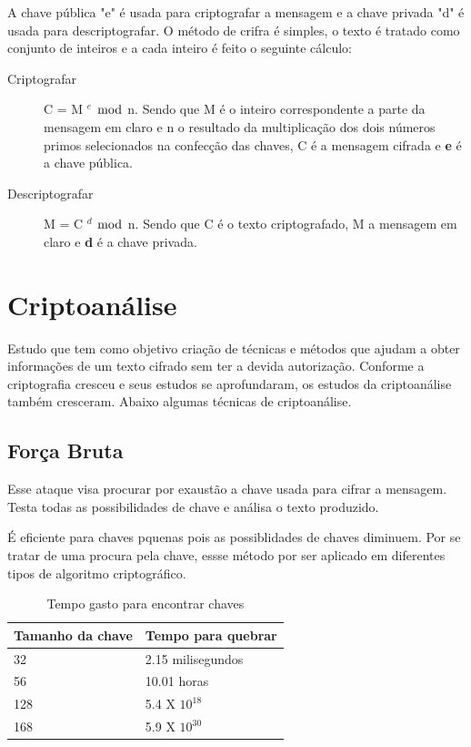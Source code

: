 %
A chave pública "e" é usada para criptografar a mensagem e a chave privada "d" é usada para descriptografar. O método de crifra é simples, o texto é tratado como conjunto de inteiros e a cada inteiro é feito o seguinte cálculo:

\begin{description}
\item [Criptografar]
C = M $^ e$ $\bmod$ n. Sendo que M é o inteiro correspondente a parte da mensagem em claro e n o resultado da multiplicação dos dois números primos selecionados na confecção  das chaves, C é a mensagem cifrada e \textbf{e} é a chave pública. 
\item [Descriptografar]
M = C $^ d$ $\bmod$ n. Sendo que C é o texto criptografado, M a mensagem em claro e \textbf{d} é a chave privada.
\end{description}

%
\section{Criptoanálise}
\label{cryptanalysis}

Estudo que tem como objetivo criação de técnicas e métodos que ajudam a obter informações de um texto cifrado sem ter a devida autorização. Conforme a criptografia cresceu e seus estudos se aprofundaram, os estudos da criptoanálise também cresceram. Abaixo algumas técnicas de criptoanálise.

\subsection{Força Bruta}
\label{brute-force}

Esse ataque visa procurar por exaustão a chave usada para cifrar a mensagem. Testa todas as possibilidades de chave e análisa o texto produzido. 

É eficiente para chaves pquenas pois as possiblidades de chaves diminuem. Por se tratar de uma procura pela chave, essse método por ser aplicado em diferentes tipos de algoritmo criptográfico.

\begin{table}[h]
\centering
	\begin{tabular}{|l|l|}
		\hline
		Tamanho da chave & Tempo para quebrar \\ \hline
		32 & 2.15 milisegundos \\ \hline
		56 & 10.01 horas \\ \hline
		128 & 5.4 X $ 10 ^ 18$ \\ \hline
		168 & 5.9 X $ 10 ^30$ \\ \hline
	\end{tabular}
\caption{Tempo gasto para encontrar chaves}
\end{table}

